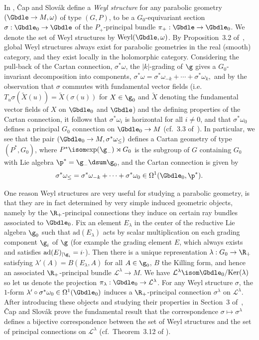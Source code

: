 In \cite{CS03}, \v{C}ap and Slov\'ak def\/ine a \emph{Weyl structure} for any parabolic geometry $(\Gbdle \rightarrow M,\omega)$ of type $(G,P)$, to be a $G_0$-equivariant section $\sigma: \Gbdle_0 \rightarrow \Gbdle$ of the $P_+$-principal bundle $\pi_+:\Gbdle \rightarrow \Gbdle_0$. We denote the set of Weyl structures by $\mathrm{Weyl}(\Gbdle,\omega)$. By Proposition~3.2 of~\cite{CS03}, global Weyl structures always exist for parabolic geometries in the real (smooth) category, and they exist locally in the holomorphic category. Considering the pull-back of the Cartan connection, $\sigma^*\omega$, the $\vert k \vert$-grading of $\g$ gives a $G_0$-invariant decomposition into components, $\sigma^*\omega = \sigma^*\omega_{-k} + \cdots + \sigma^*\omega_k,$ and by the observation that $\sigma$ commutes with fundamental vector f\/ields (i.e.\ $T_u\sigma(\widetilde{X}(u)) = \widetilde{X}(\sigma(u))$ for $X \in \g_0$ and $\widetilde{X}$ denoting the fundamental vector f\/ields of $X$ on $\Gbdle_0$ and $\Gbdle$) and the def\/ining properties of the Cartan connection, it follows that $\sigma^*\omega_i$ is horizontal for all $i \neq 0$, and that $\sigma^*\omega_0$ def\/ines a principal $G_0$ connection on $\Gbdle_0 \rightarrow M$ (cf.~3.3 of~\cite{CS03}). In particular, we see that the pair $(\Gbdle_0 \rightarrow M,\sigma^*\omega_{\leq})$ def\/ines a Cartan geometry of type $(P^*,G_0)$, where $P^* \isom \mathrm{exp}(\g_-) \rtimes G_0$ is the subgroup of $G$ containing $G_0$ with Lie algebra $\p^* = \g_- \dsum \g_0$, and the Cartan connection is given by
\[
\sigma^*\omega_{\leq} = \sigma^*\omega_{-k} + \cdots + \sigma^*\omega_0 \in \Omega^1(\Gbdle_0,\p^*).
\]

One reason Weyl structures are very useful for studying a parabolic geometry, is that they are in fact determined by very simple induced geometric objects, namely by the $\R_+$-principal connections they induce on certain ray bundles associated to $\Gbdle_0$. Fix an element $E_{\lambda}$ in the center of the reductive Lie algebra $\g_0$ such that $\mathrm{ad}(E_{\lambda})$ acts by scalar multiplication on each grading component $\g_i$ of $\g$ (for example the grading element $E$, which always exists and satisf\/ies $\mathrm{ad}(E)_{\vert \g_i} = i \cdot$). Then there is a unique representation $\lambda: G_0 \rightarrow \R_+$ satisfying $\lambda'(A) = B(E_{\lambda},A)$ for all $A \in \g_0$, $B$ the Killing form, and hence an associated $\R_+$-principal bundle $\mathcal{L}^{\lambda} \rightarrow M$. We have $\mathcal{L}^{\lambda} \isom \Gbdle_0/\mathrm{Ker}(\lambda)$ so let us denote the projection $\pi_{\lambda}: \Gbdle_0 \rightarrow \mathcal{L}^{\lambda}$. For any Weyl structure $\sigma$, the $1$-form $\lambda' \circ \sigma^*\omega_0 \in \Omega^1(\Gbdle_0)$ induces a $\R_+$-principal connection $\sigma^{\lambda}$ on $\mathcal{L}^{\lambda}$. After introducing these objects and studying their properties in Section~3 of~\cite{CS03}, \v{C}ap and Slov\'ak prove the fundamental result that the correspondence $\sigma \mapsto \sigma^{\lambda}$ def\/ines a bijective correspondence between the set of Weyl structures and the set of principal connections on $\mathcal{L}^{\lambda}$ (cf.\ Theorem~3.12 of \cite{CS03}).

